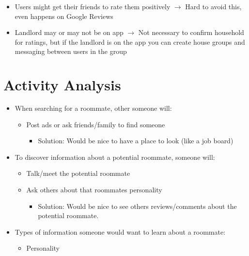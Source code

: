 \documentclass{article}
\begin{document}
\begin{appendices}
\begin{itemize}
    \item Users might get their friends to rate them positively
    \newline $\rightarrow{}$ Hard to avoid this, even happens on Google Reviews
    
    \item Landlord may or may not be on app
    \newline $\rightarrow{}$ Not necessary to confirm household for ratings, but if the landlord is on 
    the app you can create house groups and messaging between users in the group
\end{itemize}


\newpage
\section{Activity Analysis}
\begin{itemize}
    \item When searching for a roommate, other someone will:
        \begin{itemize}
            \item Post ads or ask friends/family to find someone
            \begin{itemize}
                \item Solution: Would be nice to have a place to look (like a job board)
            \end{itemize}
        \end{itemize}
    \item To discover information about a potential roommate, someone will:
        \begin{itemize}
                \item Talk/meet the potential roommate
                \item Ask others about that roommates personality
                \begin{itemize}
                    \item Solution: Would be nice to see others reviews/comments about the potential 
                    roommate.
                \end{itemize}
        \end{itemize}
    \item Types of information someone would want to learn about a roommate:
        \begin{itemize}
            \item Personality
                \begin{itemize}

\end{itemize}
\end{itemize}
\end{itemize}
\end{appendices}
\end{document}
